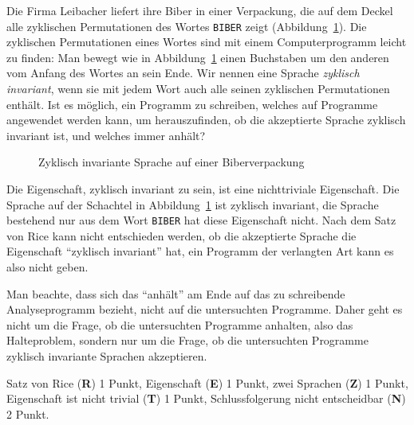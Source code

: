 Die Firma Leibacher liefert ihre Biber in einer Verpackung, die auf dem
Deckel alle zyklischen Permutationen des Wortes \texttt{BIBER} zeigt
(Abbildung~\ref{60000041:fig}).
Die zyklischen Permutationen eines Wortes sind mit einem Computerprogramm
leicht zu finden: Man bewegt wie in Abbildung~\ref{60000041:fig} 
einen Buchstaben um den anderen vom Anfang des Wortes an sein Ende.
Wir nennen eine Sprache {\em zyklisch invariant}, wenn sie mit jedem
Wort auch alle seinen zyklischen Permutationen enthält.
Ist es möglich, ein Programm zu schreiben, welches auf Programme
angewendet werden kann, um herauszufinden,
ob die akzeptierte Sprache zyklisch invariant ist, und welches immer
anhält?
\begin{figure}[h]
\centering
{}
\caption{Zyklisch invariante Sprache auf einer Biberverpackung
\label{60000041:fig}}
\end{figure}


\begin{loesung}
Die Eigenschaft, zyklisch invariant zu sein, ist eine nichttriviale
Eigenschaft.
Die Sprache auf der Schachtel in Abbildung~\ref{60000041:fig} ist
zyklisch invariant, die Sprache bestehend nur aus dem Wort
\texttt{BIBER} hat diese Eigenschaft nicht.
Nach dem Satz von Rice kann nicht entschieden werden, ob die akzeptierte
Sprache die Eigenschaft ``zyklisch invariant'' hat, ein Programm der 
verlangten Art kann es also nicht geben.
\end{loesung}

\begin{diskussion}
Man beachte, dass sich das ``anhält'' am Ende auf das zu schreibende
Analyseprogramm bezieht, nicht auf die untersuchten Programme.
Daher geht es nicht um die Frage, ob die untersuchten Programme
anhalten, also das Halteproblem, sondern nur um die Frage, ob die
untersuchten Programme zyklisch invariante Sprachen akzeptieren.
\end{diskussion}

\begin{bewertung}
Satz von Rice ({\bf R}) 1 Punkt,
Eigenschaft ({\bf E}) 1 Punkt,
zwei Sprachen ({\bf Z}) 1 Punkt,
Eigenschaft ist nicht trivial ({\bf T}) 1 Punkt,
Schlussfolgerung nicht entscheidbar ({\bf N}) 2 Punkt.
\end{bewertung}


